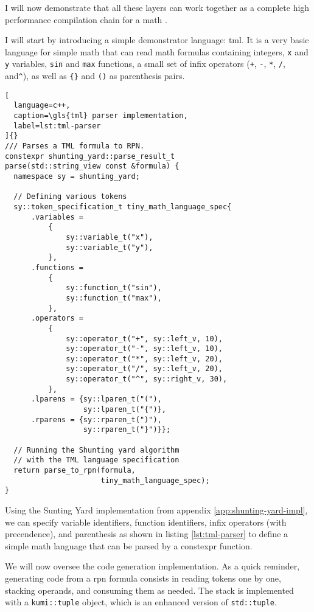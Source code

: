 \documentclass[../main]{subfiles}
\begin{document}
I will now demonstrate that all these layers can work together
as a complete high performance compilation chain for a math .

I will start by introducing a simple demonstrator language: \gls{tml}.
It is a very basic language for simple math that can read math formulas
containing integers, \lstinline{x} and \lstinline{y} variables,
\lstinline{sin} and \lstinline{max} functions, a small set of infix operators
(\lstinline{+}, \lstinline{-}, \lstinline{*}, \lstinline{/}, and\lstinline{^}),
as well as \lstinline|{}| and \lstinline{()} as parenthesis pairs.

\begin{lstlisting}[
  language=c++,
  caption=\gls{tml} parser implementation,
  label=lst:tml-parser
]{}
/// Parses a TML formula to RPN.
constexpr shunting_yard::parse_result_t
parse(std::string_view const &formula) {
  namespace sy = shunting_yard;

  // Defining various tokens
  sy::token_specification_t tiny_math_language_spec{
      .variables =
          {
              sy::variable_t("x"),
              sy::variable_t("y"),
          },
      .functions =
          {
              sy::function_t("sin"),
              sy::function_t("max"),
          },
      .operators =
          {
              sy::operator_t("+", sy::left_v, 10),
              sy::operator_t("-", sy::left_v, 10),
              sy::operator_t("*", sy::left_v, 20),
              sy::operator_t("/", sy::left_v, 20),
              sy::operator_t("^", sy::right_v, 30),
          },
      .lparens = {sy::lparen_t("("),
                  sy::lparen_t("{")},
      .rparens = {sy::rparen_t(")"),
                  sy::rparen_t("}")}};

  // Running the Shunting yard algorithm
  // with the TML language specification
  return parse_to_rpn(formula,
                      tiny_math_language_spec);
}
\end{lstlisting}

Using the Sunting Yard implementation from
appendix \ref{app:shunting-yard-impl}, we can specify variable identifiers,
function identifiers, infix operators (with precendence), and parenthesis
as shown in listing \ref{lst:tml-parser} to define a simple math language
that can be parsed by a \gls{constexpr} function.

We will now oversee the code generation implementation.
As a quick reminder, generating code from a \gls{rpn} formula
consists in reading tokens one by one, stacking operands, and consuming
them as needed. The stack is implemented with a \lstinline{kumi::tuple} object,
which is an enhanced version of \lstinline{std::tuple}.
\end{document}
